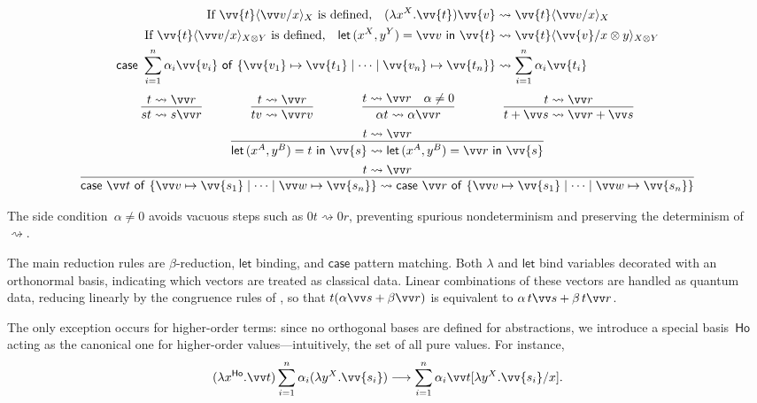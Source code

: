 \documentclass[runningheads,orivec,envcountsame,envcountsect]{llncs}
\newcommand\lra{\longrightarrow}
\newcommand\ansubst[2]{\ensuremath{\langle #1 \rangle_{#2}}}
\newcommand\AbsBasis{\ensuremath{\mathsf{Ho}}}
\def\Pair#1#2{(#1,#2)} %
\def\Lam#1#2#3{\lambda#1^{#2}{.}#3} %
\def\letkeyword{\mathsf{let}}
\def\inkeyword{\mathsf{in}}
\def\LetP#1#2#3#4#5#6{\letkeyword\,\Pair{#1^{#2}}{#3^{#4}}=#5~\inkeyword~#6}
\def\gencase#1#2#3#4#5{\ensuremath{\mathsf{case}~#1~\mathsf{of}~\{#2\mapsto #4 \mid \dotsb \mid #3\mapsto #5\}}}
\def\lraneq{\rightsquigarrow}
\begin{document}
\begin{table}[t]
  \begin{align*}
    \text{If }\vv{t}\ansubst{\vv v/x}{X}\text{ is defined,}\quad
    (\Lam{x}{X}{\vv{t}})\vv{v}
    &\lraneq \vv{t}\ansubst{\vv v/x}{X}\\
    \text{If }\vv{t}\ansubst{\vv v/x}{X\otimes Y}\text{ is defined,}\quad
    \LetP{x}{X}{y}{Y}{\vv v}{\vv{t}}
    &\lraneq \vv{t}\ansubst{\vv{v}/x\otimes y}{X\otimes Y}\\
    \gencase{\sum_{i=1}^{n}\alpha_i \vv{v_i}}{\vv{v_1}}{\vv{v_n}}{\vv{t_1}}{\vv{t_n}}
    &\lraneq \sum_{i=1}^{n}\alpha_i \vv{t_i}
  \end{align*}
  \[
    \begin{array}{c}
      \infer{st\lraneq s\vv r}{t\lraneq \vv r}
      \qquad\qquad
      \infer{tv\lraneq \vv rv}{t\lraneq\vv r}
      \qquad\qquad
      \infer{\alpha t\lraneq \alpha \vv r}{t\lraneq\vv r & \alpha\neq 0}
      \qquad\qquad
      \infer{t+\vv s\lraneq\vv r+\vv s}{t\lraneq\vv r}
      \\[5pt]
      \infer{\LetP{x}{A}{y}{B}{t}{\vv{s}}\lraneq
      \LetP{x}{A}{y}{B}{\vv r}{\vv{s}}}{t\lraneq \vv r} 
      \\[5pt]
      \infer{\gencase{\vv t}{\vv v}{\vv w}{\vv{s_1}}{\vv{s_n}}\lraneq
      \gencase{\vv r}{\vv v}{\vv w}{\vv{s_1}}{\vv{s_n}}}{t\lraneq \vv r}
    \end{array}
  \]
  \caption{Reduction system}
  \label{tab:Reduction}
\end{table}

The side condition~$\alpha\neq0$ avoids vacuous steps such as
$0t\lraneq0r$, preventing spurious nondeterminism and preserving the
determinism of~$\lraneq$.

The main reduction rules are $\beta$-reduction, $\mathsf{let}$ binding, and
$\mathsf{case}$ pattern matching.  
Both $\lambda$ and $\mathsf{let}$ bind variables decorated with an orthonormal
basis, indicating which vectors are treated as classical data.  Linear
combinations of these vectors are handled as quantum data, reducing linearly by
the congruence rules of , so that
$t(\alpha\vv s+\beta\vv r)$ is equivalent to
$\alpha\,t\vv s+\beta\,t\vv r$.

The only exception occurs for higher-order terms: since no orthogonal bases are
defined for abstractions, we introduce a special basis~$\AbsBasis$ acting as
the canonical one for higher-order values—intuitively, the set of all pure
values.  For instance,
\[
  (\Lam{x}{\AbsBasis}{\vv t})
  \sum_{i=1}^{n}\alpha_i(\Lam{y}{X}{\vv{s_i}})
  \lra
  \sum_{i=1}^n\alpha_i\vv t[\Lam{y}{X}{\vv{s_i}}/x].
\]
\end{document}
